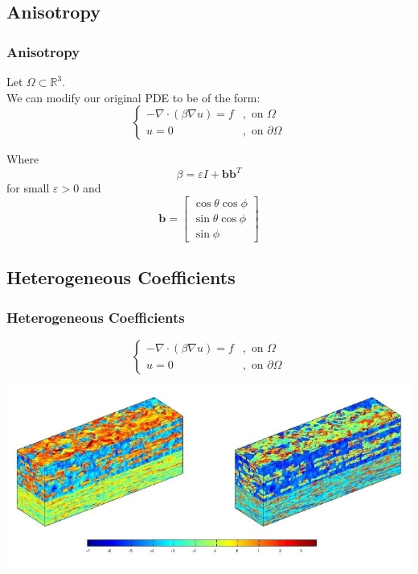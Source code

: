 \documentclass[xcolor=dvipsnames]{beamer}
\newcommand{\vc}{\boldsymbol}
\newcommand{\e}{\varepsilon}
\newcommand{\RR}{\mathbb{R}}
\begin{document}
\subsection{Anisotropy}
\begin{frame}
  \frametitle{Anisotropy}
  
  Let $\Omega \subset \RR^3$.\\
  We can modify our original PDE to be of the form:
  $$
  \begin{cases}
    -\nabla \cdot (\beta \nabla u) = f &,\text{ on } \Omega\\ 
    u=0 &,\text{ on } \partial \Omega
  \end{cases}
  $$

  Where 
  $$\beta = \e I + \vc b \vc b^T$$
  for small $\e > 0$ and
  $$\vc b = \begin{bmatrix} \cos \theta \cos \phi\\ \sin \theta 
  \cos \phi \\ \sin \phi \end{bmatrix}$$

\end{frame}

\subsection{Heterogeneous Coefficients}
\begin{frame}
  \frametitle{Heterogeneous Coefficients}
  
  $$
  \begin{cases}
    -\nabla \cdot (\beta \nabla u) = f &,\text{ on } \Omega\\ 
    u=0 &,\text{ on } \partial \Omega
  \end{cases}
  $$

    \begin{center} 
      \includegraphics[width=\textwidth]{spe10perm.jpg}
    \end{center} 

\end{frame}
\end{document}
